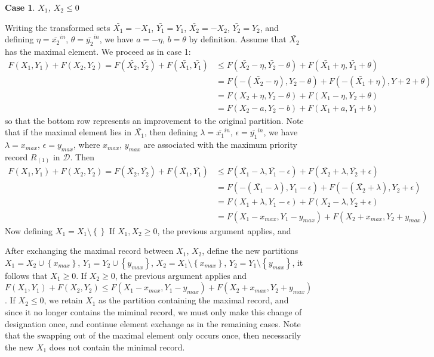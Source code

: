 \documentclass{article}
\theoremstyle{case}
\newtheorem{case}{Case}
\begin{document}
\begin{case}
$X_1$,  $X_2 \leq 0$
\end{case}
Writing the transformed sets $\bar{X_1} = -X_1$, $\bar{Y_1} = Y_1$, $\bar{X_2} = -X_2$, $\bar{Y_2} = Y_2$, and defining $\eta = \bar{x_2}^{in}$, $\theta = \bar{y_2}^{in}$, we have $a = -\eta$, $b = \theta$ by definition. Assume that $\bar{X_2}$ has the maximal element. We proceed as in case 1:
\begin{align*}
F(X_1, Y_1) + F(X_2, Y_2) = F(\bar{X_2}, \bar{Y_2}) + F(\bar{X_1}, \bar{Y_1}) & \leq F(\bar{X_2} - \eta, \bar{Y_2} - \theta) + F(\bar{X_1} + \eta, \bar{Y_1} + \theta) \\
& = F(-\left( \bar{X_2} - \eta\right), Y_2 - \theta) + F(-\left( \bar{X_1} + \eta \right), Y+2 + \theta) \\
& = F(X_2 + \eta, Y_2 - \theta) + F(X_1 - \eta, Y_2 + \theta) \\
& = F(X_2 - a, Y_2 - b) + F(X_1 + a, Y_1 + b)
\end{align*}
so that the bottom row represents an improvement to the original partition.
Note that if the maximal element lies in $\bar{X_1}$, then defining $\lambda = \bar{x_1}^{in}$, $\epsilon = \bar{y_1}^{in}$, we have $\lambda = x_{max}$, $\epsilon = y_{max}$, where $x_{max}$, $y_{max}$ are associated with the maximum priority record $R_{(1)}$ in $\mathcal{D}$. Then
\begin{align*}
F(X_1, Y_1) + F(X_2, Y_2) = F(\bar{X_2}, \bar{Y_2}) + F(\bar{X_1}, \bar{Y_1}) & \leq F(\bar{X_1} - \lambda, \bar{Y_1} - \epsilon) + F(\bar{X_2} + \lambda, \bar{Y_2} + \epsilon) \\
& = F(-\left( \bar{X_1} - \lambda\right), Y_1 - \epsilon) + F(-\left( \bar{X_2} + \lambda \right), Y_2 + \epsilon) \\
& = F(X_1 + \lambda, Y_1 - \epsilon) + F(X_2 - \lambda, Y_2 + \epsilon) \\
& = F(X_1 - x_{max}, Y_1 - y_{max}) + F(X_2 + x_{max}, Y_2 + y_{max})
\end{align*}
Now defining $X_1 = X_1\setminus\left\lbrace \right\rbrace$ If $X_1, X_2 \geq 0$, the previous argument applies, and 


After exchanging the maximal record between $X_1$, $X_2$, define the new partitions $X_1 = X_2\cup \left\lbrace x_{max}\right\rbrace$, $Y_1 = Y_2\cup \left\lbrace y_{max}\right\rbrace$, $X_2 = X_1\setminus \left\lbrace x_{max}\right\rbrace$, $Y_2 = Y_1\setminus \left\lbrace y_{max}\right\rbrace$, it follows that $X_1 \geq 0$. If $X_2 \geq 0$, the previous argument applies and $F(X_1, Y_1) + F(X_2, Y_2) \leq F(X_1 - x_{max}, Y_1 - y_{max}) + F(X_2 + x_{max}, Y_2 + y_{max})$. If $X_2 \leq 0$, we retain $X_1$ as the partition containing the maximal record, and since it no longer contains the miminal record, we must only make this change of designation once, and continue element exchange as in the remaining cases. Note that the swapping out of the maximal element only occurs once, then necessarily the new $X_1$ does not contain the minimal record.
\end{document}
